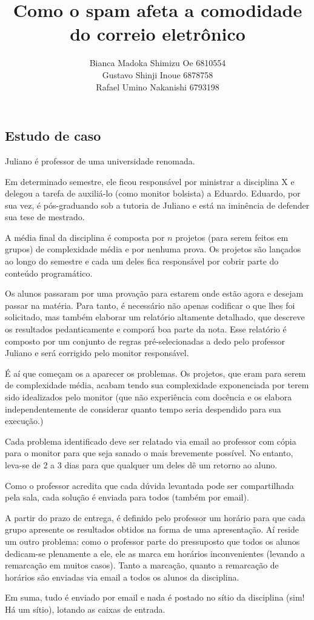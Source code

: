 \documentclass[a4paper,10pt]{article}
\title{Como o spam afeta a comodidade do correio eletrônico}
\author{Bianca Madoka Shimizu Oe 6810554\\Gustavo Shinji Inoue   6878758\\Rafael Umino Nakanishi 6793198}
\begin{document}
\maketitle
\newpage

\section{}
\subsection{Estudo de caso}

    Juliano é professor de uma universidade renomada.
    
    Em determinado semestre, ele ficou responsável por
ministrar a disciplina X e delegou a tarefa de auxiliá-lo
(como monitor bolsista) a Eduardo. Eduardo, por sua vez,
é pós-graduando sob a tutoria de Juliano e está na iminência
de defender sua tese de mestrado.

    A média final da disciplina é composta por $n$ projetos
(para serem feitos em grupos) de complexidade média e por
nenhuma prova. Os projetos são lançados ao longo do semestre
e cada um deles fica responsável por cobrir parte do conteúdo
programático.

    Os alunos passaram por uma provação para estarem onde estão
agora e desejam passar na matéria. Para tanto, é necessário
não apenas codificar o que lhes foi solicitado, mas também
elaborar um relatório altamente detalhado, que descreve os
resultados pedanticamente e comporá boa parte da nota. Esse
relatório é composto por um conjunto de regras pré-selecionadas
a dedo pelo professor Juliano e será corrigido pelo monitor
responsável.

    É aí que começam os a aparecer os problemas. Os projetos,
que eram para serem de complexidade média, acabam tendo sua
complexidade exponenciada por terem sido idealizados pelo monitor
(que não experiência com docência e os elabora independentemente
de considerar quanto tempo seria despendido para sua execução.)

    Cada problema identificado deve ser relatado via email ao
professor com cópia para o monitor para que seja sanado o mais
brevemente possível. No entanto, leva-se de 2 a 3 dias para que
qualquer um deles dê um retorno ao aluno.

    Como o professor acredita que cada dúvida levantada pode ser
compartilhada pela sala, cada solução é enviada para todos (também
por email).

    A partir do prazo de entrega, é definido pelo professor um horário
para que cada grupo apresente os resultados obtidos na forma de uma
apresentação. Aí reside um outro problema: como o professor parte do
pressuposto que todos os alunos dedicam-se plenamente a ele, ele as
marca em horários inconvenientes (levando a remarcação em muitos casos).
Tanto a marcação, quanto a remarcação de horários são enviadas via email
a todos os alunos da disciplina.

    Em suma, tudo é enviado por email e nada é postado no sítio da disciplina
(sim! Há um sítio), lotando as caixas de entrada.
\end{document}
